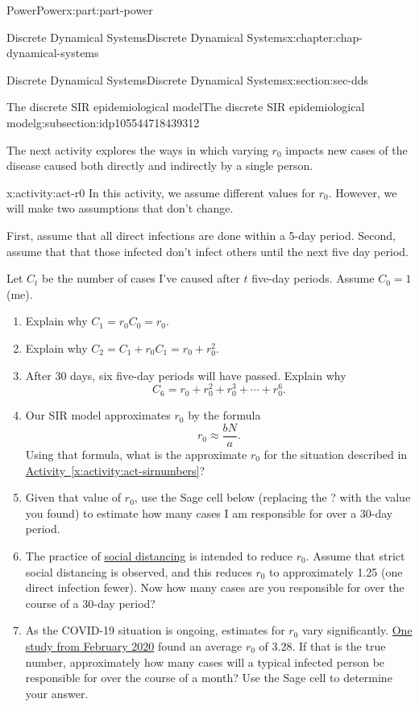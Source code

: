 \documentclass[oneside,10pt,]{book}
\newcommand{\xreffont}{\relax}
\numberwithin{equation}{section}
\begin{document}
\begin{partptx}{Power}{}{Power}{}{}{x:part:part-power}
\begin{chapterptx}{Discrete Dynamical Systems}{}{Discrete Dynamical Systems}{}{}{x:chapter:chap-dynamical-systems}
\begin{sectionptx}{Discrete Dynamical Systems}{}{Discrete Dynamical Systems}{}{}{x:section:sec-dds}
\begin{subsectionptx}{The discrete SIR epidemiological model}{}{The discrete SIR epidemiological model}{}{}{g:subsection:idp105544718439312}
\par
The next activity explores the ways in which varying \(r_0\) impacts new cases of the disease caused both directly and indirectly by a single person.%
\begin{activity}{}{x:activity:act-r0}%
In this activity, we assume different values for \(r_0\). However, we will make two assumptions that don't change.%
\par
First, assume that all direct infections are done within a 5-day period. Second, assume that that those infected don't infect others until the next five day period.%
\par
Let \(C_t\) be the number of cases I've caused after \(t\) five-day periods. Assume \(C_0 = 1\) (me).%
%
\begin{enumerate}
\item{}Explain why \(C_1 = r_0 C_0 = r_0\).%
\item{}Explain why \(C_2 = C_1 + r_0 C_1 = r_0 + r_0^2\).%
\item{}After 30 days, six five-day periods will have passed. Explain why%
\begin{equation*}
C_6 = r_0 + r_0^2 + r_0^3 + \cdots + r_0^6.
\end{equation*}
%
\item{}Our SIR model approximates \(r_0\) by the formula%
\begin{equation}
r_0 \approx \frac{bN}{a}.\label{x:men:eq-r0}
\end{equation}
Using that formula, what is the approximate \(r_0\) for the situation described in \hyperref[x:activity:act-sirnumbers]{Activity~{\xreffont\ref{x:activity:act-sirnumbers}}}?%
\item{}Given that value of \(r_0\), use the Sage cell below (replacing the ? with the value you found) to estimate how many cases I am responsible for over a 30-day period.%
\item{}The practice of \href{https://en.wikipedia.org/wiki/Social_distancing}{social distancing}\footnotemark{} is intended to reduce \(r_0\). Assume that strict social distancing is observed, and this reduces \(r_0\) to approximately 1.25 (one direct infection fewer). Now how many cases are you responsible for over the course of a 30-day period?%
\item{}As the COVID-19 situation is ongoing, estimates for \(r_0\) vary significantly. \href{https://academic.oup.com/jtm/article/27/2/taaa021/5735319}{One study from February 2020}\footnotemark{} found an average \(r_0\) of 3.28. If that is the true number, approximately how many cases will a typical infected person be responsible for over the course of a month? Use the Sage cell to determine your answer.%

\end{enumerate}
\end{activity}
\end{subsectionptx}
\end{sectionptx}
\end{chapterptx}
\end{partptx}
\end{document}
